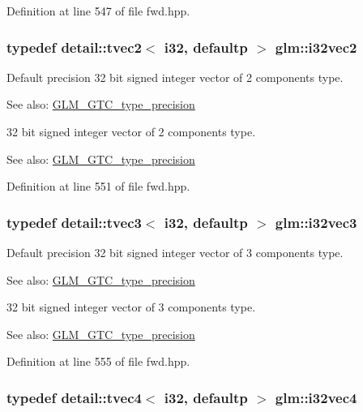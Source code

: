 Definition at line 547 of file fwd.hpp.\hypertarget{group__gtc__type__precision_gbb9ac4a278f8a8e3a3928dc9bef81089}{
\subsubsection[i32vec2]{\setlength{\rightskip}{0pt plus 5cm}typedef detail::tvec2$<$ i32, defaultp $>$ {\bf glm::i32vec2}}}
\label{group__gtc__type__precision_gbb9ac4a278f8a8e3a3928dc9bef81089}


Default precision 32 bit signed integer vector of 2 components type. \begin{Desc}
\item[See also:]\hyperlink{group__gtc__type__precision}{GLM\_\-GTC\_\-type\_\-precision}\end{Desc}
32 bit signed integer vector of 2 components type. \begin{Desc}
\item[See also:]\hyperlink{group__gtc__type__precision}{GLM\_\-GTC\_\-type\_\-precision} \end{Desc}


Definition at line 551 of file fwd.hpp.\hypertarget{group__gtc__type__precision_g79a21b299190b6fee673087376753db0}{
\subsubsection[i32vec3]{\setlength{\rightskip}{0pt plus 5cm}typedef detail::tvec3$<$ i32, defaultp $>$ {\bf glm::i32vec3}}}
\label{group__gtc__type__precision_g79a21b299190b6fee673087376753db0}


Default precision 32 bit signed integer vector of 3 components type. \begin{Desc}
\item[See also:]\hyperlink{group__gtc__type__precision}{GLM\_\-GTC\_\-type\_\-precision}\end{Desc}
32 bit signed integer vector of 3 components type. \begin{Desc}
\item[See also:]\hyperlink{group__gtc__type__precision}{GLM\_\-GTC\_\-type\_\-precision} \end{Desc}


Definition at line 555 of file fwd.hpp.\hypertarget{group__gtc__type__precision_g5fea6ade2c848bca1fa55636e75a10b9}{
\subsubsection[i32vec4]{\setlength{\rightskip}{0pt plus 5cm}typedef detail::tvec4$<$ i32, defaultp $>$ {\bf glm::i32vec4}}}
\label{group__gtc__type__precision_g5fea6ade2c848bca1fa55636e75a10b9}


